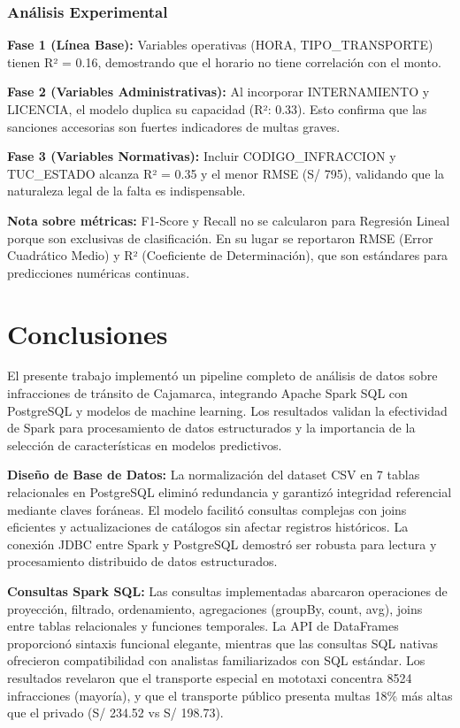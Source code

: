 \documentclass[12pt,a4paper]{article}
\begin{document}
\subsubsection{Análisis Experimental}

\textbf{Fase 1 (Línea Base):} Variables operativas (HORA, TIPO\_TRANSPORTE) tienen R² = 0.16, demostrando que el horario no tiene correlación con el monto.

\textbf{Fase 2 (Variables Administrativas):} Al incorporar INTERNAMIENTO y LICENCIA, el modelo duplica su capacidad (R²: 0.33). Esto confirma que las sanciones accesorias son fuertes indicadores de multas graves.

\textbf{Fase 3 (Variables Normativas):} Incluir CODIGO\_INFRACCION y TUC\_ESTADO alcanza R² = 0.35 y el menor RMSE (S/ 795), validando que la naturaleza legal de la falta es indispensable.

\textbf{Nota sobre métricas:} F1-Score y Recall no se calcularon para Regresión Lineal porque son exclusivas de clasificación. En su lugar se reportaron RMSE (Error Cuadrático Medio) y R² (Coeficiente de Determinación), que son estándares para predicciones numéricas continuas.

\section{Conclusiones}

El presente trabajo implementó un pipeline completo de análisis de datos sobre infracciones de tránsito de Cajamarca, integrando Apache Spark SQL con PostgreSQL y modelos de machine learning. Los resultados validan la efectividad de Spark para procesamiento de datos estructurados y la importancia de la selección de características en modelos predictivos.

\textbf{Diseño de Base de Datos:} La normalización del dataset CSV en 7 tablas relacionales en PostgreSQL eliminó redundancia y garantizó integridad referencial mediante claves foráneas. El modelo facilitó consultas complejas con joins eficientes y actualizaciones de catálogos sin afectar registros históricos. La conexión JDBC entre Spark y PostgreSQL demostró ser robusta para lectura y procesamiento distribuido de datos estructurados.

\textbf{Consultas Spark SQL:} Las consultas implementadas abarcaron operaciones de proyección, filtrado, ordenamiento, agregaciones (groupBy, count, avg), joins entre tablas relacionales y funciones temporales. La API de DataFrames proporcionó sintaxis funcional elegante, mientras que las consultas SQL nativas ofrecieron compatibilidad con analistas familiarizados con SQL estándar. Los resultados revelaron que el transporte especial en mototaxi concentra 8524 infracciones (mayoría), y que el transporte público presenta multas 18\% más altas que el privado (S/ 234.52 vs S/ 198.73).
\end{document}
